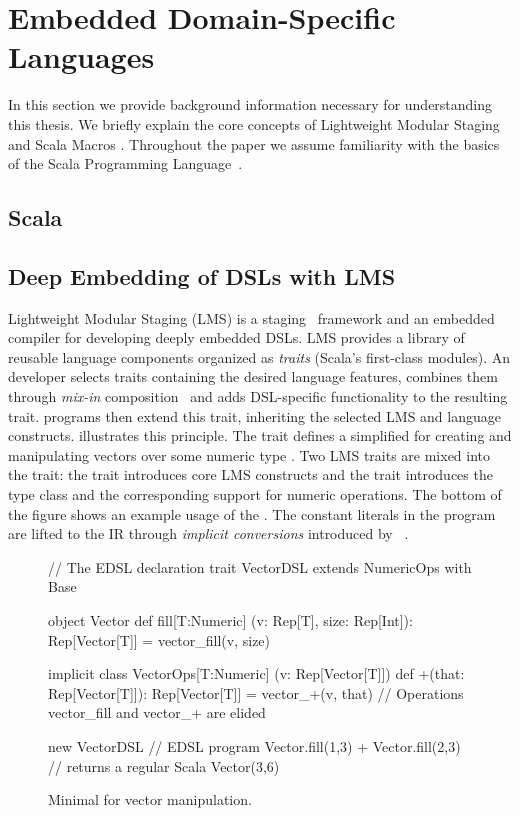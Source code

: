 \section{Embedded Domain-Specific Languages}
\label{sec:embedded-domain-specific-languages}

In this section we provide background information necessary for understanding this
thesis. We briefly explain the core concepts of Lightweight Modular Staging
\cite{rompf_lightweight_2012,rompf_optimizing_2013} and Scala Macros
\cite{burmako_scala_2013}. Throughout the paper we assume familiarity with
the basics of the Scala Programming Language~\cite{odersky_scala_2004}.
\subsection{Scala}
\subsection{Deep Embedding of DSLs with LMS}
\label{subsec:deep-embedding}

Lightweight Modular Staging (LMS) is a
staging~\cite{taha_multi-stage_1997} framework and an embedded
compiler for developing deeply embedded DSLs.  LMS provides a library
of reusable language components organized as \emph{traits} (Scala's
first-class modules).  An \edsl developer selects traits containing
the desired language features, combines them through \emph{mix-in}
composition~\cite{odersky_scalable_2005} and adds DSL-specific
functionality to the resulting \edsl trait.  \edsl programs then
extend this trait, inheriting the selected LMS and \edsl language
constructs.  illustrates this principle.  The trait
 defines a simplified \edsl for creating and
manipulating vectors over some numeric type .  Two LMS traits
are mixed into the  trait: the  trait
introduces core LMS constructs %
and the  trait introduces the  type
class and the corresponding support for numeric operations.  The
bottom of the figure shows an example usage of the \edsl. The constant
literals in the program are lifted to the IR through \emph{implicit
  conversions} introduced by
~\cite{oliveira_type_2010}.

\begin{figure}
\begin{listingtiny}
// The EDSL declaration
trait VectorDSL extends NumericOps with Base {
  object Vector {
    def fill[T:Numeric]
      (v: Rep[T], size: Rep[Int]): Rep[Vector[T]] =
      vector_fill(v, size)
  }

  implicit class VectorOps[T:Numeric]
    (v: Rep[Vector[T]]) {
    def +(that: Rep[Vector[T]]): Rep[Vector[T]] =
      vector_+(v, that)
  }
  // Operations vector_fill and vector_+ are elided
}

new VectorDSL { // EDSL program
  Vector.fill(1,3) + Vector.fill(2,3)
} // returns a regular Scala Vector(3,6)
\end{listingtiny}
\caption{\label{lst:lms} Minimal \edsl for vector manipulation.}
\end{figure}

